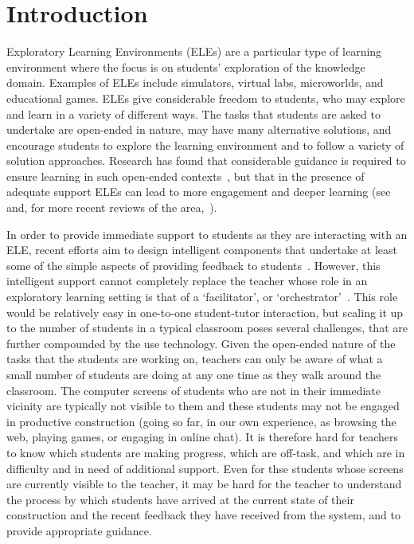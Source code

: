 \section{Introduction}
\label{sec:introduction}

Exploratory Learning Environments (ELEs) are a particular
type of learning environment where the focus is on students'
exploration of the knowledge domain. Examples of ELEs
include simulators, virtual labs, microworlds, and educational
games. ELEs give considerable freedom to students, who may explore and
learn in a variety of different ways.
%
%
The tasks that students are asked to
undertake are open-ended in nature, may have many alternative
solutions, and encourage students to explore the learning
environment and to follow a variety of solution approaches. Research
has found that considerable guidance is required to ensure learning in
such open-ended contexts~\cite{kirschner06,Kynigos92,MayerDiscovery},
but that in the presence of adequate support ELEs can lead to more engagement
and deeper learning (see~\cite{Noss96,JongJoolingen98} and, for more
recent reviews of the area,~\cite{InquiryLearningJoolingen,Healy2010Charting}). 

In order to provide immediate support to students as they are interacting
with an ELE, recent efforts aim to design intelligent components that 
undertake at least some of the simple aspects of providing feedback to 
students~\cite{MiGen-JRPIT,AmersiConati09}. 
However, this intelligent support cannot completely replace the teacher 
whose role in an exploratory learning setting is that 
of a `facilitator', or `orchestrator'~\cite{Trouche2004,Hoyles2004Integration}. 
This role would be relatively easy in one-to-one student-tutor 
interaction, but scaling it up to the number of students in a 
typical classroom poses several challenges,
that are further compounded by the use technology. 
Given the open-ended nature of the tasks that the students are working on,
teachers can only be aware of what a small number of
students are doing at any one time as they walk around the classroom. 
The computer screens of students who are not in their immediate
vicinity are typically not visible to them and these students may not be engaged
in productive construction (going so far, in our own experience, as
browsing the web, playing games, or engaging in online chat). It is
therefore hard for teachers to know which students are making progress,
which are off-task, and which are in difficulty and in need of additional support.
Even for thse students whose screens are currently visible to the teacher, 
it may be hard for the teacher to understand the process by which students have
arrived at the current state of their construction and the recent
feedback they have received from the system, and to provide appropriate
guidance. 

